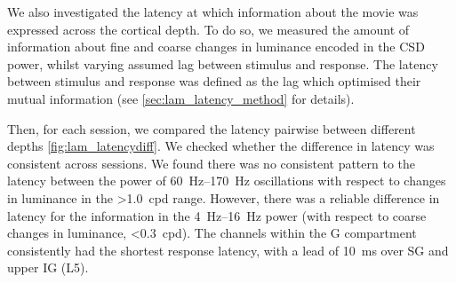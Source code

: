 We also investigated the latency at which information about the movie was expressed across the cortical depth.
To do so, we measured the amount of information about fine and coarse changes in luminance encoded in the \ac{CSD} power, whilst varying assumed lag between stimulus and response.
The latency between stimulus and response was defined as the lag which optimised their mutual information (see \autoref{sec:lam_latency_method} for details).

Then, for each session, we compared the latency pairwise between different depths \autoref{fig:lam_latencydiff}.
We checked whether the difference in latency was consistent across sessions.
We found there was no consistent pattern to the latency between the power of \SIrange{60}{170}{Hz} oscillations with respect to changes in luminance in the \SI{>1.0}{cpd} range.
However, there was a reliable difference in latency for the information in the \SIrange{4}{16}{Hz} power (with respect to coarse changes in luminance, \SI{<0.3}{cpd}).
The channels within the \ac{G} compartment consistently had the shortest response latency, with a lead of \SI{10}{\milli\second} over \ac{SG} and upper \ac{IG} (\acs{L5}).


